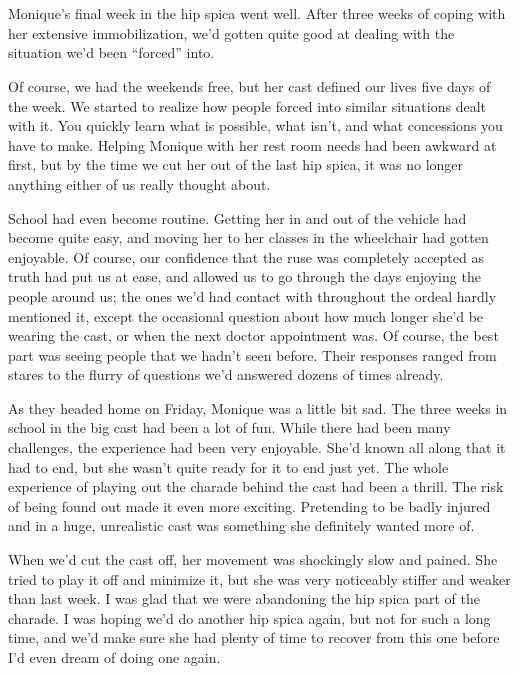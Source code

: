 \chapter{}
Monique's final week in the hip spica went well. After three weeks of coping with her
extensive immobilization, we'd gotten quite good at dealing with the situation we'd been
``forced'' into.

Of course, we had the weekends free, but her cast defined our lives five days of the week.
We started to realize how people forced into similar situations dealt with it. You quickly learn
what is possible, what isn't, and what concessions you have to make. Helping Monique with her
rest room needs had been awkward at first, but by the time we cut her out of the last hip spica,
it was no longer anything either of us really thought about.

School had even become routine. Getting her in and out of the vehicle had become quite
easy, and moving her to her classes in the wheelchair had gotten enjoyable. Of course, our
confidence that the ruse was completely accepted as truth had put us at ease, and allowed us to
go through the days enjoying the people around us; the ones we'd had contact with throughout the
ordeal hardly mentioned it, except the occasional question about how much longer she'd be
wearing the cast, or when the next doctor appointment was. Of course, the best part was seeing
people that we hadn't seen before. Their responses ranged from stares to the flurry of questions
we'd answered dozens of times already.

As they headed home on Friday, Monique was a little bit sad. The three weeks in school in
the big cast had been a lot of fun. While there had been many challenges, the experience had
been very enjoyable. She'd known all along that it had to end, but she wasn't quite ready for it
to end just yet. The whole experience of playing out the charade behind the cast had been a
thrill. The risk of being found out made it even more exciting. Pretending to be badly injured
and in a huge, unrealistic cast was something she definitely wanted more of.

When we'd cut the cast off, her movement was shockingly slow and pained. She tried to play
it off and minimize it, but she was very noticeably stiffer and weaker than last week. I was
glad that we were abandoning the hip spica part of the charade. I was hoping we'd do another hip
spica again, but not for such a long time, and we'd make sure she had plenty of time to recover
from this one before I'd even dream of doing one again.

